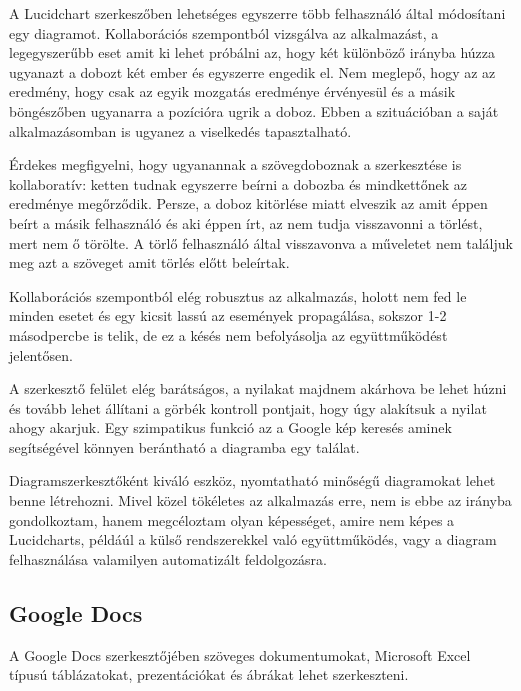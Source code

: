 A Lucidchart szerkeszőben lehetséges egyszerre több felhasználó által módosítani egy diagramot. Kollaborációs szempontból vizsgálva az alkalmazást, a legegyszerűbb eset amit ki lehet próbálni az, hogy két különböző irányba húzza ugyanazt a dobozt két ember és egyszerre engedik el. Nem meglepő, hogy az az eredmény, hogy csak az egyik mozgatás eredménye érvényesül és a másik böngészőben ugyanarra a pozícióra ugrik a doboz. Ebben a szituációban a saját alkalmazásomban is ugyanez a viselkedés tapasztalható.

Érdekes megfigyelni, hogy ugyanannak a szövegdoboznak a szerkesztése is kollaboratív: ketten tudnak egyszerre beírni a dobozba és mindkettőnek az eredménye megőrződik. Persze, a doboz kitörlése miatt elveszik az amit éppen beírt a másik felhasználó és aki éppen írt, az nem tudja visszavonni a törlést, mert nem ő törölte. A törlő felhasználó által visszavonva a műveletet nem találjuk meg azt a szöveget amit törlés előtt beleírtak.

Kollaborációs szempontból elég robusztus az alkalmazás, holott nem fed le minden esetet és egy kicsit lassú az események propagálása, sokszor 1-2 másodpercbe is telik, de ez a késés nem befolyásolja az együttműködést jelentősen.

A szerkesztő felület elég barátságos, a nyilakat majdnem akárhova be lehet húzni és tovább lehet állítani a görbék kontroll pontjait, hogy úgy alakítsuk a nyilat ahogy akarjuk. Egy szimpatikus funkció az a Google kép keresés aminek segítségével könnyen berántható a diagramba egy találat.

Diagramszerkesztőként kiváló eszköz, nyomtatható minőségű diagramokat lehet benne létrehozni. Mivel közel tökéletes az alkalmazás erre, nem is ebbe az irányba gondolkoztam, hanem megcéloztam olyan képességet, amire nem képes a Lucidcharts, példáúl a külső rendszerekkel való együttműködés, vagy a diagram felhasználása valamilyen automatizált feldolgozásra. 










 
\subsection{Google Docs}

A Google Docs szerkesztőjében szöveges dokumentumokat, Microsoft Excel típusú táblázatokat, prezentációkat és ábrákat lehet szerkeszteni.

